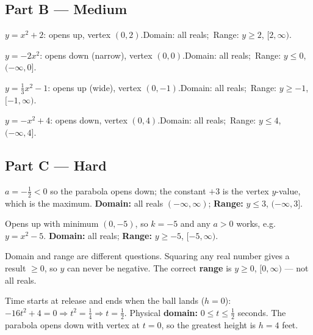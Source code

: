 \documentclass[11pt]{article}
\begin{document}
\subsection*{Part B --- Medium}
\begin{description}[leftmargin=2.4em,style=nextline,itemsep=3pt]
\item[B1.] $y=x^2+2$: opens up, vertex $(0,2)$.\quad Domain: all reals;\ Range: $y\ge 2$, $[2,\infty)$.
\item[B2.] $y=-2x^2$: opens down (narrow), vertex $(0,0)$.\quad Domain: all reals;\ Range: $y\le 0$, $(-\infty,0]$.
\item[B3.] $y=\tfrac13 x^2-1$: opens up (wide), vertex $(0,-1)$.\quad Domain: all reals;\ Range: $y\ge -1$, $[-1,\infty)$.
\item[B4.] $y=-x^2+4$: opens down, vertex $(0,4)$.\quad Domain: all reals;\ Range: $y\le 4$, $(-\infty,4]$.
\end{description}

\subsection*{Part C --- Hard}
\begin{description}[leftmargin=2.4em,style=nextline,itemsep=5pt]
\item[C1.] $a=-\tfrac12<0$ so the parabola opens down; the constant $+3$ is the vertex $y$-value, which is the maximum. \textbf{Domain:} all reals $(-\infty,\infty)$; \textbf{Range:} $y\le 3$, $(-\infty,3]$.
\item[C2.] Opens up with minimum $(0,-5)$, so $k=-5$ and any $a>0$ works, e.g. $y=x^2-5$. \textbf{Domain:} all reals; \textbf{Range:} $y\ge -5$, $[-5,\infty)$.
\item[C3.] Domain and range are different questions. Squaring any real number gives a result $\ge 0$, so $y$ can never be negative. The correct \textbf{range} is $y\ge 0$, $[0,\infty)$ --- not all reals.
\item[C4.] Time starts at release and ends when the ball lands ($h=0$): $-16t^2+4=0 \Rightarrow t^2=\tfrac14 \Rightarrow t=\tfrac12$. Physical \textbf{domain:} $0\le t\le \tfrac12$ seconds. The parabola opens down with vertex at $t=0$, so the greatest height is $h=4$ feet.
\end{description}
\end{document}
